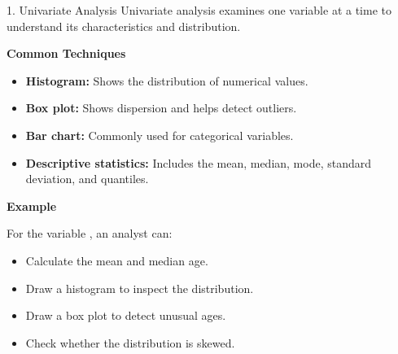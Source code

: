 \documentclass[aspectratio=169,11pt]{beamer}
\begin{document}
\begin{frame}[allowframebreaks]{1. Univariate Analysis}
\small
Univariate analysis examines one variable at a time to understand its characteristics and distribution.\par\medskip
\textbf{Common Techniques}\par\medskip
\begin{itemize}
\item \textbf{Histogram:} Shows the distribution of numerical values.
\item \textbf{Box plot:} Shows dispersion and helps detect outliers.
\item \textbf{Bar chart:} Commonly used for categorical variables.
\item \textbf{Descriptive statistics:} Includes the mean, median, mode, standard deviation, and quantiles.
\end{itemize}
\textbf{Example}\par\medskip
For the variable \texttt{}, an analyst can:\par\medskip
\begin{itemize}
\item Calculate the mean and median age.
\item Draw a histogram to inspect the distribution.
\item Draw a box plot to detect unusual ages.
\item Check whether the distribution is skewed.
\end{itemize}
\end{frame}
\end{document}
